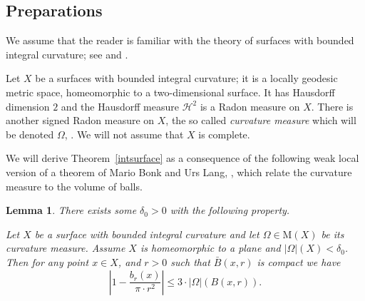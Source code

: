 \documentclass[12pt,leqno,intlimits]{amsart}
\numberwithin{equation}{section}
\newtheorem{lem}[thm]{Lemma}
\theoremstyle{definition}
\theoremstyle{remark}
\newcommand{\tref}[1]{Theorem~\ref{#1}}
\begin{document}
\subsection{Preparations}
We assume that the reader is familiar with the theory of surfaces with bounded integral curvature; see \cite{AZ} and \cite{Reshetnyak-GeomIV}.

Let $X$ be a surfaces with bounded integral curvature;
it is a locally geodesic metric space, homeomorphic to a two-dimensional surface.
It has Hausdorff dimension $2$ and the Hausdorff measure $\mathcal H^2$ is a Radon measure on $X$. There is another signed Radon measure on $X$, the so called \emph{curvature measure} which will be denoted $\Omega$, \cite[Section 8]{Reshetnyak-GeomIV}.
We will not assume that $X$ is complete.

We will derive \tref{intsurface} as a consequence of the following weak local
version of a theorem of Mario Bonk and Urs Lang, \cite{Bonk-Lang}, which relate the curvature measure to the volume of balls.

{\color{red}

\begin{lem} \label{lem:bl}
There exists some $\delta _0>0$ with the following property.

Let $X$ be a surface with bounded integral curvature and let $\Omega\in \mathrm M(X)$ be its curvature measure.
Assume $X$ is homeomorphic to a plane and $| \Omega|(X) < \delta _0$.
Then for any point $x\in X$, and $r>0$ such that
$\bar B (x,{r})$ is compact we have
$$\left|1- \frac {b_r(x)} {\pi{\cdot}r^2} \right| \leq 3 \cdot |\Omega |( B (x,{r})).$$
\end{lem}

}
\end{document}
